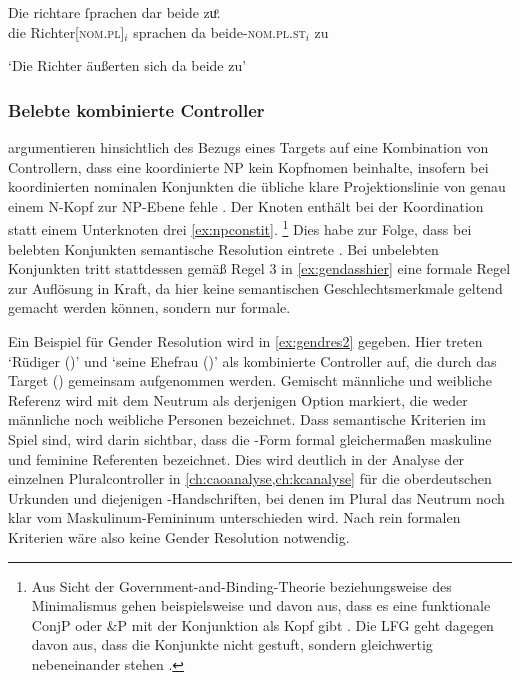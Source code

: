 \begin{exe}
\ex \label{ex:gendassgmt2}
	\gll Die richtare ſprachen dar beide zuͦ. \\
		die Richter[\textsc{nom.pl\subM}]$_i$ sprachen da
			beide-\textsc{nom.pl\subM.st}$_i$ zu \\
	\begin{taggedline}{\parencites[60\vb,
	28]{kc:H}[vgl.~abweichend][10090]{schroeder1895}}
	\trans `Die Richter äußerten sich da beide zu'
	\end{taggedline}
\end{exe}

\subsubsection{Belebte kombinierte Controller}
\label{subsubsec:x+x_dir_anim}

\textcites[182--183]{wechslerzlatic2003}[576]{wechsler2009} argumentieren
hinsichtlich des Bezugs eines Targets auf eine Kombination von Controllern,
dass eine koordinierte NP kein Kopf\-nomen beinhalte, insofern bei
koordinierten nominalen Konjunkten die übliche klare Projektionslinie von genau
einem N-Kopf zur NP-Ebene fehle \autocites[183,
Anm.~85]{wechslerzlatic2003}[585, Anm.~7]{wechsler2009}. Der Knoten 
enthält bei der Koordination statt einem Unterknoten drei \cref{ex:npconstit}.%
%
	\footnote{Aus Sicht der Government-and-Binding-Theorie beziehungsweise des
	Minimalismus gehen beispielsweise
	\textcites{johannessen1998}{johannessen2005} und \citet{shen2019} davon aus, dass es
	eine funktionale ConjP oder \&P mit der Konjunktion als Kopf gibt
	\autocite[dagegen aber][]{borsley2005}. Die LFG geht dagegen davon aus,
	dass die Konjunkte nicht gestuft, sondern gleichwertig nebeneinander stehen
	\autocites[vgl.~z.\,B.][]{peterson2004}{sadlernordlinger2006}.}
%
Dies habe zur Folge, dass bei belebten Konjunkten semantische Resolution
eintrete \autocites[183]{wechslerzlatic2003}[576]{wechsler2009}. Bei unbelebten
Konjunkten tritt stattdessen gemäß Regel 3 in \cref{ex:gendasshier} eine
formale Regel zur Auflösung in Kraft, da hier keine semantischen
Geschlechtsmerkmale geltend gemacht werden können, sondern nur formale.

Ein Beispiel für Gender Resolution wird in \cref{ex:gendres2} gegeben. Hier
treten  `Rüdiger (\MascM)' und 
`seine Ehefrau (\FemF)' als kombinierte Controller auf, die durch das
Target  (\NeutMF) gemeinsam aufgenommen werden. Gemischt männliche
und weibliche Referenz wird mit dem Neutrum als derjenigen Option markiert,
die weder männliche noch weibliche Personen bezeichnet. Dass semantische
Kriterien im Spiel sind, wird darin sichtbar, dass die -Form formal
gleichermaßen maskuline und feminine Referenten bezeichnet. Dies wird deutlich
in der Analyse der einzelnen Pluralcontroller in
\cref{ch:caoanalyse,ch:kcanalyse} für die oberdeutschen Urkunden und diejenigen
\KC{}-Handschriften, bei denen im Plural das Neutrum noch klar vom
Maskulinum-Femininum unterschieden wird. Nach rein formalen Kriterien wäre also
keine Gender Resolution notwendig.

